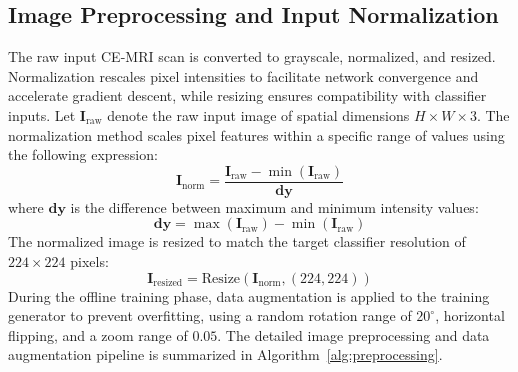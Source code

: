 \documentclass[journal,twoside]{IEEEtran}
\begin{document}
\subsection{Image Preprocessing and Input Normalization}
The raw input CE-MRI scan is converted to grayscale, normalized, and resized. Normalization rescales pixel intensities to facilitate network convergence and accelerate gradient descent, while resizing ensures compatibility with classifier inputs. Let $\mathbf{I}_{\text{raw}}$ denote the raw input image of spatial dimensions $H \times W \times 3$. The normalization method scales pixel features within a specific range of values using the following expression:
\begin{equation}
\mathbf{I}_{\text{norm}} = \frac{\mathbf{I}_{\text{raw}} - \min(\mathbf{I}_{\text{raw}})}{\mathbf{dy}}
\end{equation}
where $\mathbf{dy}$ is the difference between maximum and minimum intensity values:
\begin{equation}
\mathbf{dy} = \max(\mathbf{I}_{\text{raw}}) - \min(\mathbf{I}_{\text{raw}})
\end{equation}
The normalized image is resized to match the target classifier resolution of $224 \times 224$ pixels:
\begin{equation}
\mathbf{I}_{\text{resized}} = \text{Resize}(\mathbf{I}_{\text{norm}}, (224, 224))
\end{equation}
During the offline training phase, data augmentation is applied to the training generator to prevent overfitting, using a random rotation range of $20^{\circ}$, horizontal flipping, and a zoom range of $0.05$. The detailed image preprocessing and data augmentation pipeline is summarized in Algorithm~\ref{alg:preprocessing}.
\end{document}

